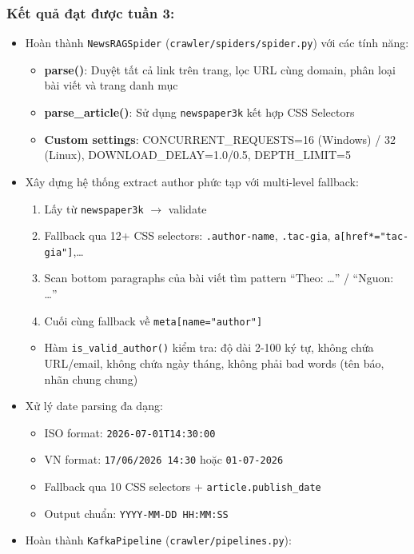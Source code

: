 \hypertarget{kux1ebft-quux1ea3-ux111ux1ea1t-ux111ux1b0ux1ee3c-tuux1ea7n-3}{%
\subsubsection{Kết quả đạt được tuần
3:}}

\begin{itemize}
\tightlist
\item
  Hoàn thành \texttt{NewsRAGSpider} (\texttt{crawler/spiders/spider.py})
  với các tính năng:

  \begin{itemize}
  \tightlist
  \item
    \textbf{parse()}: Duyệt tất cả link trên trang, lọc URL cùng domain,
    phân loại bài viết và trang danh mục
  \item
    \textbf{parse\_article()}: Sử dụng \texttt{newspaper3k} kết hợp CSS
    Selectors
  \item
    \textbf{Custom settings}: CONCURRENT\_REQUESTS=16 (Windows) / 32
    (Linux), DOWNLOAD\_DELAY=1.0/0.5, DEPTH\_LIMIT=5
  \end{itemize}
\item
  Xây dựng hệ thống extract author phức tạp với multi-level fallback:

  \begin{enumerate}
  \def\labelenumi{\arabic{enumi}.}
  \tightlist
  \item
    Lấy từ \texttt{newspaper3k} \(\rightarrow\) validate
  \item
    Fallback qua 12+ CSS selectors: \texttt{.author-name},
    \texttt{.tac-gia}, \texttt{a{[}href*="tac-gia"{]}},\ldots{}
  \item
    Scan bottom paragraphs của bài viết tìm pattern ``Theo: \ldots{}'' /
    ``Nguon: \ldots{}''
  \item
    Cuối cùng fallback về \texttt{meta{[}name="author"{]}}
  \end{enumerate}

  \begin{itemize}
  \tightlist
  \item
    Hàm \texttt{is\_valid\_author()} kiểm tra: độ dài 2-100 ký tự, không
    chứa URL/email, không chứa ngày tháng, không phải bad words (tên
    báo, nhãn chung chung)
  \end{itemize}
\item
  Xử lý date parsing đa dạng:

  \begin{itemize}
  \tightlist
  \item
    ISO format: \texttt{2026-07-01T14:30:00}
  \item
    VN format: \texttt{17/06/2026\ 14:30} hoặc \texttt{01-07-2026}
  \item
    Fallback qua 10 CSS selectors + \texttt{article.publish\_date}
  \item
    Output chuẩn: \texttt{YYYY-MM-DD\ HH:MM:SS}
  \end{itemize}
\item
  Hoàn thành \texttt{KafkaPipeline} (\texttt{crawler/pipelines.py}):


\end{itemize}

